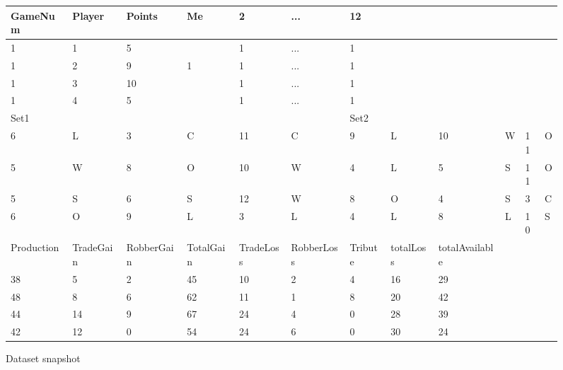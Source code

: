 \documentclass[journal]{vgtc}                %
\begin{document}
\begin{figure}[h!]
  \centering
  \begin{tabular}{|l|l|l|l|l|l|l|l|l|l|l|l|}
    \hline
    GameNum & Player & Points & Me & 2 & ... & 12 & & & & & \\ \hline
    1 & 1 & 5 & & 1 & ... & 1 & & & & & \\ \hline
    1 & 2 & 9 & 1 & 1 & ... & 1 & & & & & \\ \hline
    1 & 3 & 10 & & 1 & ... & 1 & & & & & \\ \hline
    1 & 4 & 5 & & 1 & ... & 1 & & & & & \\ \hline \hline
    Set1 & & & & & & Set2 & & & & & \\ \hline
    6 & L & 3 & C & 11 & C & 9 & L & 10 & W & 11 & O \\ \hline
    5 & W & 8 & O & 10 & W & 4 & L & 5 & S & 11 & O \\ \hline
    5 & S & 6 & S & 12 & W & 8 & O & 4 & S & 3 & C \\ \hline
    6 & O & 9 & L & 3 & L & 4 & L & 8 & L & 10 & S \\ \hline \hline
    Production & TradeGain & RobberGain & TotalGain & TradeLoss & RobberLoss &
    Tribute & totalLoss & totalAvailable & & & \\ \hline
    38 & 5 & 2 & 45 & 10 & 2 & 4 & 16 & 29 & & & \\ \hline
    48 & 8 & 6 & 62 & 11 & 1 & 8 & 20 & 42 & & & \\ \hline
    44 & 14 & 9 & 67 & 24 & 4 & 0 & 28 & 39 & & & \\ \hline
    42 & 12 & 0 & 54 & 24 & 6 & 0 & 30 & 24 & & & \\ \hline
  \end{tabular}
  \caption{Dataset snapshot}
  \label{tab:data}
\end{figure}
\end{document}
